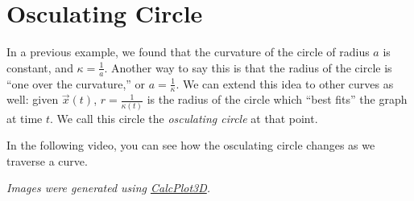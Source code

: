 \documentclass{ximera}
\begin{document}
\section*{Osculating Circle}

In a previous example, we found that the curvature of the circle of radius $a$ is constant, and $\kappa = \frac{1}{a}$. Another way to say this is that the radius of the circle is ``one over the curvature,'' or $a = \frac{1}{\kappa}$. We can extend this idea to other curves as well: given $\vec{x}(t)$, $r = \frac{1}{\kappa(t)}$ is the radius of the circle which ``best fits'' the graph at time $t$. We call this circle the \emph{osculating circle} at that point.

In the following video, you can see how the osculating circle changes as we traverse a curve.



\textit{Images were generated using \href{https://www.monroecc.edu/faculty/paulseeburger/calcnsf/CalcPlot3D/}{CalcPlot3D}.}
\end{document}
